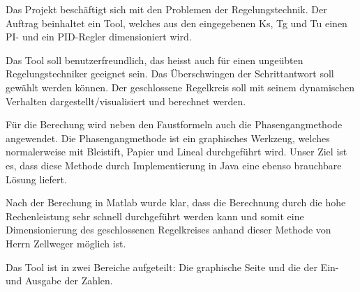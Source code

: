 Das  Projekt besch\"aftigt  sich mit  den Problemen  der Regelungstechnik. Der
Auftrag beinhaltet ein Tool, welches aus  den eingegebenen Ks, Tg und Tu einen
PI- und ein PID-Regler dimensioniert wird.

Das  Tool soll  benutzerfreundlich, das  heisst auch  f\"ur einen  unge\"ubten
Regelungstechniker geeignet sein. Das  \"Uberschwingen der Schrittantwort soll
gew\"ahlt  werden  k\"onnen. Der  geschlossene   Regelkreis  soll  mit  seinem
dynamischen Verhalten dargestellt/visualisiert und berechnet werden.

F\"ur die  Berechung wird  neben den  Faustformeln auch  die Phasengangmethode
angewendet.   Die  Phasengangmethode  ist ein  graphisches  Werkzeug,  welches
normalerweise mit Bleistift, Papier und Lineal durchgef\"uhrt wird. Unser Ziel
ist  es,  dass  diese  Methode  durch  Implementierung  in  Java  eine  ebenso
brauchbare L\"osung liefert.

Nach  der Berechung  in  Matlab  wurde klar,  dass  die  Berechnung durch  die
hohe Rechenleistung  sehr schnell  durchgef\"uhrt werden  kann und  somit eine
Dimensionierung des geschlossenen Regelkreises anhand dieser Methode von Herrn
Zellweger m\"oglich ist.

Das Tool  ist in zwei  Bereiche aufgeteilt: Die  graphische Seite und  die der
Ein- und Ausgabe der Zahlen.

